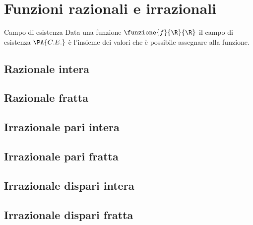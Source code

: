 

\chapter{Funzioni razionali e irrazionali}
\begin{definizionet}{Campo di esistenza}{}
Data una funzione $\funzione{f}{\R}{\R}$ il campo di esistenza $\PA{C.E.}$ è l'insieme dei valori che è possibile assegnare alla funzione.
\end{definizionet}
\section{Razionale intera}
\section{Razionale fratta}
\section{Irrazionale pari intera}
\section{Irrazionale pari fratta}
\section{Irrazionale dispari intera}
\section{Irrazionale dispari fratta}